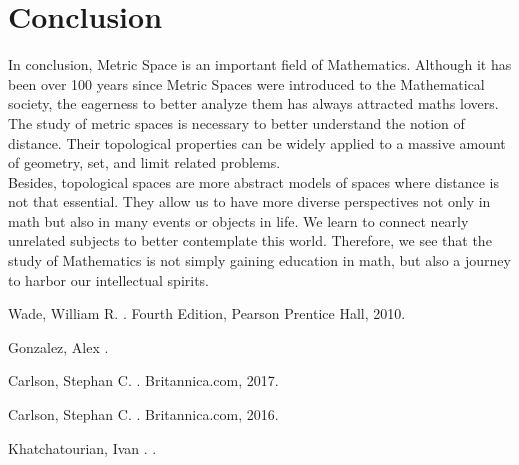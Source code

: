\documentclass[12pt, reqno]{amsart}
\theoremstyle{definition}
\numberwithin{equation}{section}
\newcommand{\tabb}{\hspace*{1cm}}
\begin{document}
\section{Conclusion}
\hspace*{0.5cm} In conclusion, Metric Space is an important field of Mathematics. Although it has been over 100 years since Metric Spaces were introduced to the Mathematical society, the eagerness to better analyze them has always attracted maths lovers. The study of metric spaces is necessary to better understand the notion of distance. Their topological properties can be widely applied to a massive amount of geometry, set, and limit related problems.\\
\tabb Besides, topological spaces are more abstract models of spaces where distance is not that essential. They allow us to have more diverse perspectives not only in math but also in many events or objects in life. We learn to connect nearly unrelated subjects to better contemplate this world. Therefore, we see that the study of Mathematics is not simply gaining education in math, but also a journey to harbor our intellectual spirits.
\vfill
\pagebreak

 
\begin{thebibliography}{10}

Wade, William R.
. 
\newblock Fourth Edition, Pearson Prentice Hall, 2010.

Gonzalez, Alex
. 

Carlson, Stephan C.
. 
\newblock Britannica.com, 2017.

Carlson, Stephan C.
. 
\newblock Britannica.com, 2016.

Khatchatourian, Ivan
. 
.
\end{thebibliography}
\end{document}
